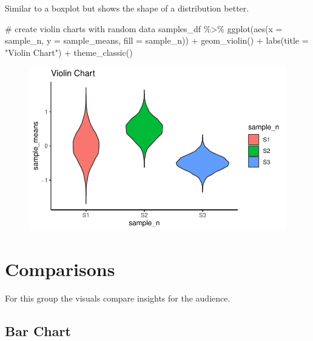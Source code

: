 \documentclass[
  letterpaper,
  DIV=11,
  numbers=noendperiod]{scrreprt}
\newenvironment{Shaded}{\begin{snugshade}}{\end{snugshade}}
\newcommand{\AttributeTok}[1]{\textcolor[rgb]{0.40,0.45,0.13}{#1}}
\newcommand{\CommentTok}[1]{\textcolor[rgb]{0.37,0.37,0.37}{#1}}
\newcommand{\FunctionTok}[1]{\textcolor[rgb]{0.28,0.35,0.67}{#1}}
\newcommand{\NormalTok}[1]{\textcolor[rgb]{0.00,0.23,0.31}{#1}}
\newcommand{\SpecialCharTok}[1]{\textcolor[rgb]{0.37,0.37,0.37}{#1}}
\newcommand{\StringTok}[1]{\textcolor[rgb]{0.13,0.47,0.30}{#1}}
\begin{document}
Similar to a boxplot but shows the shape of a distribution better.

\begin{Shaded}
\begin{Highlighting}[]
\CommentTok{\# create violin charts with random data}
\NormalTok{samples\_df }\SpecialCharTok{\%\textgreater{}\%}
  \FunctionTok{ggplot}\NormalTok{(}\FunctionTok{aes}\NormalTok{(}\AttributeTok{x =}\NormalTok{ sample\_n, }\AttributeTok{y =}\NormalTok{ sample\_means, }\AttributeTok{fill =}\NormalTok{ sample\_n)) }\SpecialCharTok{+}
  \FunctionTok{geom\_violin}\NormalTok{() }\SpecialCharTok{+}
  \FunctionTok{labs}\NormalTok{(}\AttributeTok{title =} \StringTok{"Violin Chart"}\NormalTok{) }\SpecialCharTok{+}
  \FunctionTok{theme\_classic}\NormalTok{()}
\end{Highlighting}
\end{Shaded}

\begin{figure}[H]

{\centering \includegraphics{./visualizing-data_files/figure-pdf/unnamed-chunk-6-1.pdf}

}

\end{figure}

\hypertarget{comparisons}{%
\section{Comparisons}\label{comparisons}}

For this group the visuals compare insights for the audience.

\hypertarget{bar-chart}{%
\subsection{Bar Chart}\label{bar-chart}}
\end{document}
